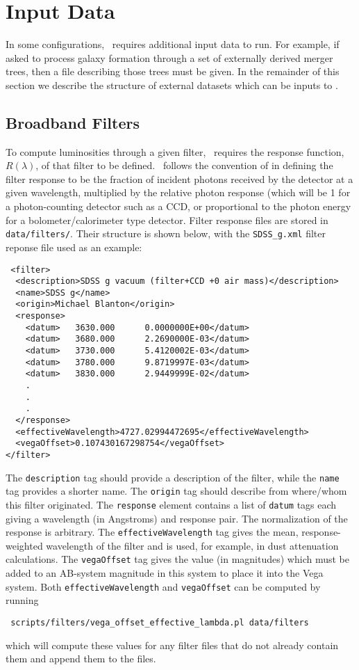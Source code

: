 \chapter{Input Data}

In some configurations, \glc\ requires additional input data to run. For example, if asked to process galaxy formation through a set of externally derived merger trees, then a file describing those trees must be given. In the remainder of this section we describe the structure of external datasets which can be inputs to \glc.

\section{Broadband Filters}

To compute luminosities through a given filter, \glc\ requires the response function, $R(\lambda)$, of that filter to be defined. \glc\ follows the convention of \cite{hogg_k_2002} in defining the filter response to be the fraction of incident photons received by the detector at a given wavelength, multiplied by the relative photon response (which will be 1 for a photon-counting detector such as a CCD, or proportional to the photon energy for a bolometer/calorimeter type detector. Filter response files are stored in {\tt data/filters/}. Their structure is shown below, with the {\tt SDSS\_g.xml} filter reponse file used as an example:
\begin{verbatim}
 <filter>
  <description>SDSS g vacuum (filter+CCD +0 air mass)</description>
  <name>SDSS g</name>
  <origin>Michael Blanton</origin>
  <response>
    <datum>   3630.000      0.0000000E+00</datum>
    <datum>   3680.000      2.2690000E-03</datum>
    <datum>   3730.000      5.4120002E-03</datum>
    <datum>   3780.000      9.8719997E-03</datum>
    <datum>   3830.000      2.9449999E-02</datum>
    .
    .
    . 
  </response>
  <effectiveWavelength>4727.02994472695</effectiveWavelength>
  <vegaOffset>0.107430167298754</vegaOffset>
</filter>
\end{verbatim}
The {\tt description} tag should provide a description of the filter, while the {\tt name} tag provides a shorter name. The {\tt origin} tag should describe from where/whom this filter originated. The {\tt response} element contains a list of {\tt datum} tags each giving a wavelength (in Angstroms) and response pair. The normalization of the response is arbitrary. The {\tt effectiveWavelength} tag gives the mean, response-weighted wavelength of the filter and is used, for example, in dust attenuation calculations. The {\tt vegaOffset} tag gives the value (in magnitudes) which must be added to an AB-system magnitude in this system to place it into the Vega system. Both {\tt effectiveWavelength} and {\tt vegaOffset} can be computed by running
\begin{verbatim}
 scripts/filters/vega_offset_effective_lambda.pl data/filters
\end{verbatim}
which will compute these values for any filter files that do not already contain them and append them to the files.

